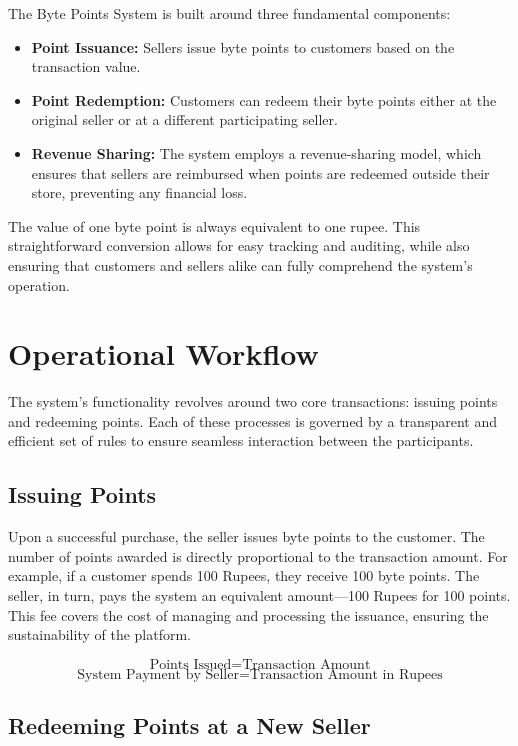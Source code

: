 \documentclass[a4paper,12pt]{article}
\begin{document}
The Byte Points System is built around three fundamental components:

\begin{itemize}
    \item \textbf{Point Issuance:} Sellers issue byte points to customers based on the transaction value.
    \item \textbf{Point Redemption:} Customers can redeem their byte points either at the original seller or at a different participating seller.
    \item \textbf{Revenue Sharing:} The system employs a revenue-sharing model, which ensures that sellers are reimbursed when points are redeemed outside their store, preventing any financial loss.
\end{itemize}

The value of one byte point is always equivalent to one rupee. This straightforward conversion allows for easy tracking and auditing, while also ensuring that customers and sellers alike can fully comprehend the system’s operation.

\section{Operational Workflow}

The system’s functionality revolves around two core transactions: issuing points and redeeming points. Each of these processes is governed by a transparent and efficient set of rules to ensure seamless interaction between the participants.

\subsection{Issuing Points}

Upon a successful purchase, the seller issues byte points to the customer. The number of points awarded is directly proportional to the transaction amount. For example, if a customer spends 100 Rupees, they receive 100 byte points. The seller, in turn, pays the system an equivalent amount—100 Rupees for 100 points. This fee covers the cost of managing and processing the issuance, ensuring the sustainability of the platform.

\[
\text{Points Issued} = \text{Transaction Amount}
\]
\[
\text{System Payment by Seller} = \text{Transaction Amount in Rupees}
\]

\subsection{Redeeming Points at a New Seller}
\end{document}
